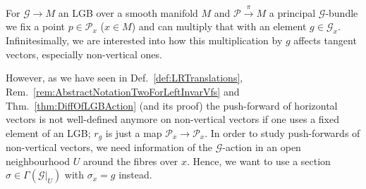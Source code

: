\documentclass[a4paper,oneside,11pt,bibliography=totoc]{scrartcl}
\theoremstyle{plain}
\theoremstyle{remark}
\theoremstyle{definition}
\begin{document}
\begin{center}
\end{center}

For $\mathcal{G} \to M$ an LGB over a smooth manifold $M$ and $\mathcal{P} \stackrel{\pi}{\to} M$ a principal $\mathcal{G}$-bundle we fix a point $p \in \mathcal{P}_x$ ($x \in M$) and can multiply that with an element $g \in \mathcal{G}_x$. Infinitesimally, we are interested into how this multiplication by $g$ affects tangent vectors, especially non-vertical ones.

However, as we have seen in Def.\ \ref{def:LRTranslations}, Rem.\ \ref{rem:AbstractNotationTwoForLeftInvarVfs} and Thm.\ \ref{thm:DiffOfLGBAction} (and its proof) the push-forward of horizontal vectors is not well-defined anymore on non-vertical vectors if one uses a fixed element of an LGB; $r_g$ is just a map $\mathcal{P}_x \to \mathcal{P}_x$. In order to study push-forwards of non-vertical vectors, we need information of the $\mathcal{G}$-action in an open neighbourhood $U$ around the fibres over $x$. Hence, we want to use a section $\sigma \in \Gamma(\mathcal{G}|_U)$ with $\sigma_x= g$ instead.
\end{document}
